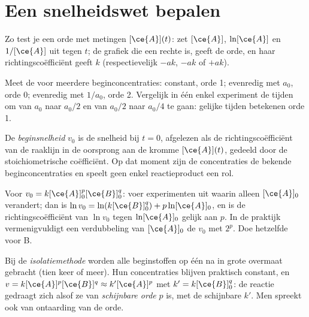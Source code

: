 \section{Een snelheidswet bepalen}

\begin{method}[De integratiemethode]\label{met:b1:rate-laws:integral}
Zo test je een orde met metingen $[\ce{A}](t)$: zet $[\ce{A}]$,
$\ln[\ce{A}]$ en $1/[\ce{A}]$ uit tegen $t$; de grafiek die een rechte is,
geeft de orde, en haar richtingscoëfficiënt geeft $k$ (respectievelijk
$-ak$, $-ak$ of $+ak$).
\end{method}

\begin{method}[De halveringstijdmethode]\label{met:b1:rate-laws:half-life}
Meet de  voor meerdere beginconcentraties: constant, orde
1; evenredig met $a_0$, orde 0; evenredig met $1/a_0$, orde 2. Vergelijk
in één enkel experiment de tijden om van $a_0$ naar $a_0/2$ en van
$a_0/2$ naar $a_0/4$ te gaan: gelijke tijden betekenen orde 1.
\end{method}

\begin{definition}[Beginsnelheid]\label{def:b1:rate-laws:initial-rate}
De \emph{beginsnelheid} $v_0$ is de snelheid bij
$t = 0$, afgelezen als de richtingscoëfficiënt van de raaklijn in de
oorsprong aan de kromme $[\ce{A}](t)$, gedeeld door de stoichiometrische
coëfficiënt. Op dat moment zijn de concentraties de bekende
beginconcentraties en speelt geen enkel reactieproduct een rol.
\end{definition}

\begin{method}\label{met:b1:rate-laws:initial-rates}
Voor $v_0 = k[\ce{A}]_0^p[\ce{B}]_0^q$: voer experimenten uit waarin
alleen $[\ce{A}]_0$ verandert; dan is
$\ln v_0 = \ln(k[\ce{B}]_0^q) + p\ln[\ce{A}]_0$, en is de
richtingscoëfficiënt van $\ln v_0$ tegen $\ln[\ce{A}]_0$ gelijk aan $p$.
In de praktijk vermenigvuldigt een verdubbeling van $[\ce{A}]_0$ de
 $v_0$ met $2^p$. Doe hetzelfde voor B.
\end{method}

\begin{definition}\label{def:b1:rate-laws:apparent-order}
Bij de \emph{isolatiemethode} worden alle
beginstoffen op één na in grote overmaat gebracht (tien keer of meer).
Hun concentraties blijven praktisch constant, en
$v = k[\ce{A}]^p[\ce{B}]^q \approx k'[\ce{A}]^p$
met $k' = k[\ce{B}]_0^q$: de reactie gedraagt zich alsof ze van
\emph{schijnbare orde} $p$ is, met de schijnbare
 $k'$. Men spreekt ook van ontaarding van de orde.
\end{definition}

